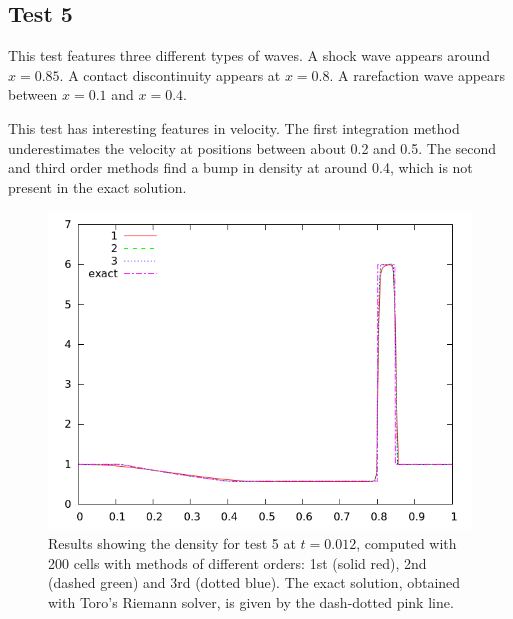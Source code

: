 \documentclass[10pt]{article}
\begin{document}
\clearpage

\subsection{Test 5}
This test features three different types of waves. A shock wave appears around $x=0.85$. A contact discontinuity appears at $x=0.8$. A rarefaction wave appears between $x=0.1$ and $x=0.4$.

This test has interesting features in velocity. The first integration method underestimates the velocity at positions between about 0.2 and 0.5. The second and third order methods find a bump in density at around 0.4, which is not present in the exact solution.

\begin{figure}[h]
  \begin{center}
     \includegraphics[width=.95\textwidth]{den_T5.png}	
  \end{center}
  \caption{Results showing the density for test 5 at $t=0.012$, computed with 200 cells with methods of different orders: 1st (solid red), 2nd (dashed green) and 3rd (dotted blue). The exact solution, obtained with Toro's Riemann solver, is given by the dash-dotted pink line.}
  \label{fig:den_T5}
\end{figure}
\end{document}
